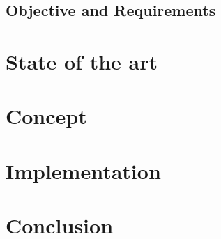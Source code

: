 \documentclass[aac]{iosart2x}
\begin{document}
\subsection{Objective and Requirements}\label{s1.2}

\section{State of the art}\label{s2}
\section{Concept}\label{s3}
\section{Implementation}\label{s4}
\section{Conclusion}\label{s5}









\nocite{*} 

%
\end{document}
